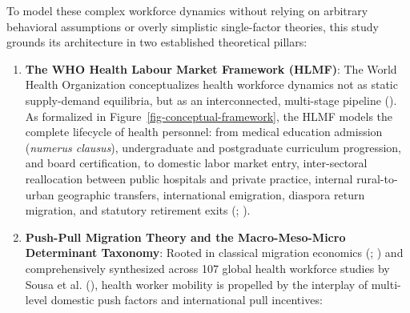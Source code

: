 \documentclass[
  11pt,
  a4paper]{article}
\providecommand{\tightlist}{%
  \setlength{\itemsep}{0pt}\setlength{\parskip}{0pt}}
\begin{document}
To model these complex workforce dynamics without relying on arbitrary
behavioral assumptions or overly simplistic single-factor theories, this
study grounds its architecture in two established theoretical pillars:

\begin{enumerate}
\def\labelenumi{\arabic{enumi}.}
\tightlist
\item
  \textbf{The WHO Health Labour Market Framework (HLMF)}: The World
  Health Organization conceptualizes health workforce dynamics not as
  static supply-demand equilibria, but as an interconnected, multi-stage
  pipeline (). As
  formalized in Figure~\ref{fig-conceptual-framework}, the HLMF models
  the complete lifecycle of health personnel: from medical education
  admission (\emph{numerus clausus}), undergraduate and postgraduate
  curriculum progression, and board certification, to domestic labor
  market entry, inter-sectoral reallocation between public hospitals and
  private practice, internal rural-to-urban geographic transfers,
  international emigration, diaspora return migration, and statutory
  retirement exits (; ).
\item
  \textbf{Push-Pull Migration Theory and the Macro-Meso-Micro
  Determinant Taxonomy}: Rooted in classical migration economics
  (;
  ) and comprehensively synthesized
  across 107 global health workforce studies by Sousa et al.
  (), health worker mobility is propelled
  by the interplay of multi-level domestic push factors and
  international pull incentives:


\end{enumerate}
\end{document}
